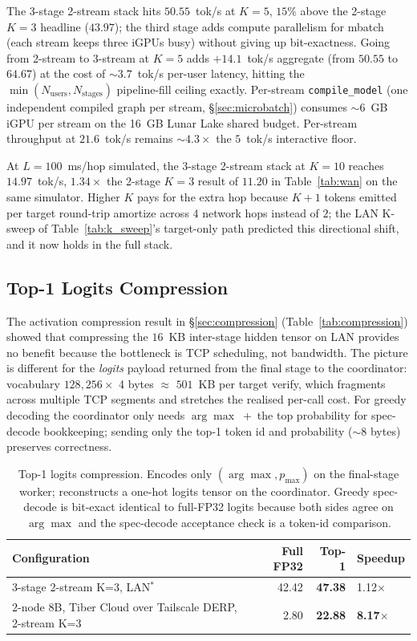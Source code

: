 \documentclass[11pt]{article}
\newcommand{\brk}{\discretionary{}{}{}}
\begin{document}
The 3-stage 2-stream stack hits $50.55$~tok/s at $K\!=\!5$, $15\%$ above the 2-stage $K\!=\!3$ headline ($43.97$); the third stage adds compute parallelism for mbatch (each stream keeps three iGPUs busy) without giving up bit-exactness. Going from 2-stream to 3-stream at $K\!=\!5$ adds $+14.1$~tok/s aggregate (from $50.55$ to $64.67$) at the cost of ${\sim}3.7$~tok/s per-user latency, hitting the $\min(N_\text{users}, N_\text{stages})$ pipeline-fill ceiling exactly. Per-stream \texttt{compile\_\brk model} (one independent compiled graph per stream, \S\ref{sec:microbatch}) consumes ${\sim}6$~GB iGPU per stream on the 16~GB Lunar Lake shared budget. Per-stream throughput at $21.6$~tok/s remains ${\sim}4.3\times$ the $5$~tok/s interactive floor.

At $L\!=\!100$~ms/hop simulated, the 3-stage 2-stream stack at $K\!=\!10$ reaches $14.97$~tok/s, $1.34\times$ the 2-stage $K\!=\!3$ result of $11.20$ in Table~\ref{tab:wan} on the same simulator. Higher $K$ pays for the extra hop because $K\!+\!1$ tokens emitted per target round-trip amortize across $4$ network hops instead of $2$; the LAN K-sweep of Table~\ref{tab:k_sweep}'s target-only path predicted this directional shift, and it now holds in the full stack.

\subsection{Top-1 Logits Compression}
\label{sec:topk_compress}

The activation compression result in \S\ref{sec:compression} (Table~\ref{tab:compression}) showed that compressing the $16$~KB inter-stage hidden tensor on LAN provides no benefit because the bottleneck is TCP scheduling, not bandwidth. The picture is different for the \emph{logits} payload returned from the final stage to the coordinator: vocabulary $128{,}256 \times$ 4 bytes $\approx$ $501$~KB per target verify, which fragments across multiple TCP segments and stretches the realised per-call cost. For greedy decoding the coordinator only needs $\arg\max$~+~the top probability for spec-decode bookkeeping; sending only the top-1 token id and probability ($\sim$8 bytes) preserves correctness.

\begin{table}[ht]
\centering
\caption{Top-1 logits compression. Encodes only $(\arg\max, p_\text{max})$ on the final-stage worker; reconstructs a one-hot logits tensor on the coordinator. Greedy spec-decode is bit-exact identical to full-FP32 logits because both sides agree on $\arg\max$ and the spec-decode acceptance check is a token-id comparison.}
\label{tab:topk_compression}
\begin{tabular}{@{}lrrl@{}}
\toprule
Configuration & Full FP32 & Top-1 & Speedup \\
\midrule
3-stage 2-stream K=3, LAN$^*$ & 42.42 & \textbf{47.38} & 1.12$\times$ \\
2-node 8B, Tiber Cloud over Tailscale DERP, 2-stream K=3 & 2.80 & \textbf{22.88} & \textbf{8.17$\times$} \\
\bottomrule
\end{tabular}
\end{table}
\end{document}
